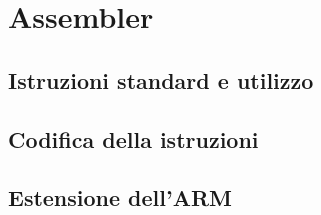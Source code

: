 \section{Assembler}
\subsection{Istruzioni standard e utilizzo}
\subsection{Codifica della istruzioni}
\subsection{Estensione dell'ARM}
